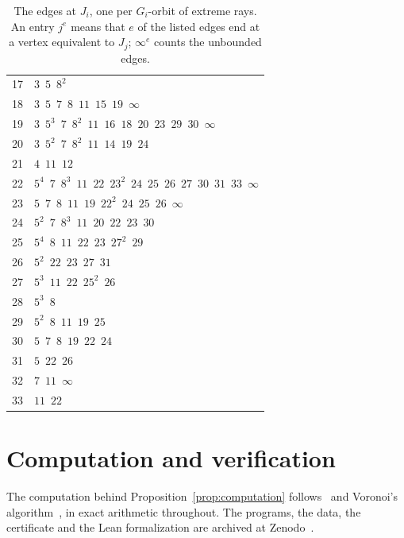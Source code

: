 \documentclass[11pt]{amsart}
\theoremstyle{definition}
\theoremstyle{remark}
\numberwithin{equation}{section}
\numberwithin{table}{section}
\numberwithin{figure}{section}
\begin{document}
\begin{table}[h]
\begin{tabular}{@{}r p{}@{}}
17 & $3$\ $5$\ $8^{2}$ \\
18 & $3$\ $5$\ $7$\ $8$\ $11$\ $15$\ $19$\ $\infty$ \\
19 & $3$\ $5^{3}$\ $7$\ $8^{2}$\ $11$\ $16$\ $18$\ $20$\ $23$\ $29$\ $30$\ $\infty$ \\
20 & $3$\ $5^{2}$\ $7$\ $8^{2}$\ $11$\ $14$\ $19$\ $24$ \\
21 & $4$\ $11$\ $12$ \\
22 & $5^{4}$\ $7$\ $8^{3}$\ $11$\ $22$\ $23^{2}$\ $24$\ $25$\ $26$\ $27$\ $30$\ $31$\ $33$\ $\infty$ \\
23 & $5$\ $7$\ $8$\ $11$\ $19$\ $22^{2}$\ $24$\ $25$\ $26$\ $\infty$ \\
24 & $5^{2}$\ $7$\ $8^{3}$\ $11$\ $20$\ $22$\ $23$\ $30$ \\
25 & $5^{4}$\ $8$\ $11$\ $22$\ $23$\ $27^{2}$\ $29$ \\
26 & $5^{2}$\ $22$\ $23$\ $27$\ $31$ \\
27 & $5^{3}$\ $11$\ $22$\ $25^{2}$\ $26$ \\
28 & $5^{3}$\ $8$ \\
29 & $5^{2}$\ $8$\ $11$\ $19$\ $25$ \\
30 & $5$\ $7$\ $8$\ $19$\ $22$\ $24$ \\
31 & $5$\ $22$\ $26$ \\
32 & $7$\ $11$\ $\infty$ \\
33 & $11$\ $22$ \\
\bottomrule
\end{tabular}
\caption{The edges at $J_i$, one per $G_i$-orbit of extreme rays. An entry $j^{e}$ means that $e$ of the listed edges end at a vertex equivalent to $J_j$; $\infty^{e}$ counts the unbounded edges.}
\label{tab:edges}
\end{table}

\section{Computation and verification}\label{app:verification}

The computation behind Proposition~\ref{prop:computation} follows~\cite{AK2020} and Voronoi's algorithm~\cite{Voronoi1908,Schuermann2009}, in exact arithmetic throughout. The programs, the data, the certificate and the Lean formalization are archived at Zenodo~\cite{D5archive}.
\end{document}
